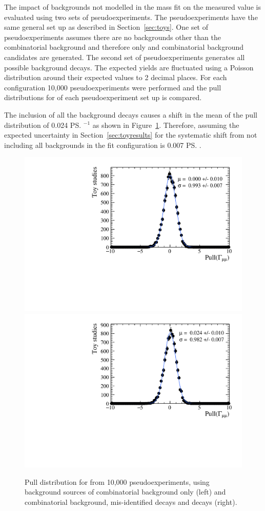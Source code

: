 The impact of backgrounds not modelled in the mass fit on the measured \tmumu value is evaluated using two sets of pseudoexperiments. The pseudoexperiments have the same general set up as described in Section~\ref{sec:toys}. One set of pseudoexperiments assumes there are no backgrounds other than the combinatorial background and therefore only \bsmumu and combinatorial background candidates are generated. The second set of pseudoexperiments generates all possible background decays. The expected yields are fluctuated using a Poisson distribution around their expected values to 2 decimal places. For each configuration 10,000 pseudoexperiments were performed and the pull distributions for \Gmumu of each pseudoexperiment set up is compared. %

The inclusion of all the background decays causes a shift in the mean of the \Gmumu pull distribution of 0.024 \ps$^{-1}$ as shown in Figure~\ref{fig:bkdcontam}. Therefore, assuming the expected uncertainty in Section~\ref{sec:toyresults} for \tmumu the systematic shift from not including all backgrounds in the fit configuration is 0.007 \ps.%

\begin{figure}[htbp]
    \centering
        \includegraphics[width=0.49 \textwidth]{./Figs/LifetimeSystematics/Gamma_pull_mass_pdf_Run1.pdf}
        \includegraphics[width=0.49 \textwidth]{./Figs/LifetimeSystematics/5320_all_bkgnds_gamma_pull_CKM.pdf}
    \caption{Pull distribution for \Gmumu from 10,000 pseudoexperiments, using background sources of combinatorial background only (left) and combinatorial background, mis-identified decays and \bdmumu decays (right).}
    \label{fig:bkdcontam}
\end{figure}

